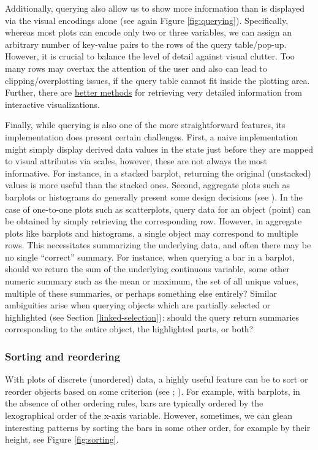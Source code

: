 \documentclass[
]{book}
\begin{document}
Additionally, querying also allow us to show more information than is displayed via the visual encodings alone (see again Figure \ref{fig:querying}). Specifically, whereas most plots can encode only two or three variables, we can assign an arbitrary number of key-value pairs to the rows of the query table/pop-up. However, it is crucial to balance the level of detail against visual clutter. Too many rows may overtax the attention of the user and also can lead to clipping/overplotting issues, if the query table cannot fit inside the plotting area. Further, there are \hyperref[bidirectional-communication]{better methods} for retrieving very detailed information from interactive visualizations.

Finally, while querying is also one of the more straightforward features, its implementation does present certain challenges. First, a naive implementation might simply display derived data values in the state just before they are mapped to visual attributes via scales, however, these are not always the most informative. For instance, in a stacked barplot, returning the original (unstacked) values is more useful than the stacked ones. Second, aggregate plots such as barplots or histograms do generally present some design decisions (see ). In the case of one-to-one plots such as scatterplots, query data for an object (point) can be obtained by simply retrieving the corresponding row. However, in aggregate plots like barplots and histograms, a single object may correspond to multiple rows. This necessitates summarizing the underlying data, and often there may be no single ``correct'' summary. For instance, when querying a bar in a barplot, should we return the sum of the underlying continuous variable, some other numeric summary such as the mean or maximum, the set of all unique values, multiple of these summaries, or perhaps something else entirely? Similar ambiguities arise when querying objects which are partially selected or highlighted (see Section \ref{linked-selection}): should the query return summaries corresponding to the entire object, the highlighted parts, or both?

\subsubsection{Sorting and reordering}\label{sorting-and-reordering}

With plots of discrete (unordered) data, a highly useful feature can be to sort or reorder objects based on some criterion (see ; ). For example, with barplots, in the absence of other ordering rules, bars are typically ordered by the lexographical order of the x-axis variable. However, sometimes, we can glean interesting patterns by sorting the bars in some other order, for example by their height, see Figure \ref{fig:sorting}.
\end{document}
